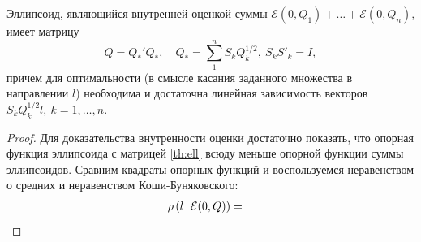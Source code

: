 \documentclass[10pt, a4paper]{article}
\renewcommand{\ell}{\mathcal{E}}
\begin{document}
\begin{theorem}
Эллипсоид, являющийся внутренней оценкой суммы $\ell(0,Q_1)+\dots+\ell(0,Q_n)$, имеет матрицу
\begin{equation}\label{th:ell} Q = Q_*'Q_*,\quad Q_*=\sum\limits_{1}^{n} S_kQ_k^{1/2},\ S_kS'_k=I, \end{equation}
причем для оптимальности (в смысле касания заданного множества в направлении $l$) необходима и достаточна линейная зависимость векторов $S_kQ_k^{1/2}l,\ k=1,\dots,n.$
\end{theorem}
\begin{proof}
Для доказательства внутренности оценки достаточно показать, что опорная функция эллипсоида с матрицей \eqref{th:ell} всюду меньше опорной функции суммы эллипсоидов. Сравним квадраты опорных функций и воспользуемся неравенством о средних и неравенством Коши-Буняковского:
\begin{align*}
\sufu{l}{\ell(0,Q)} &=  
\end{align*}
\end{proof}
\end{document}
